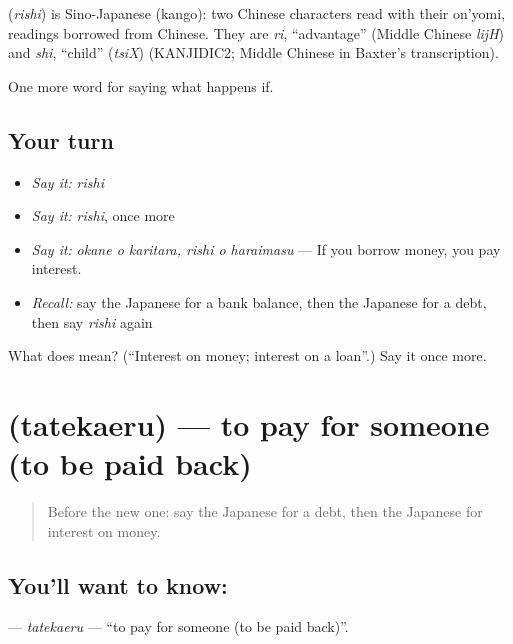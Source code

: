 \begin{cousinweb}
\textbf{} (\emph{rishi}) is Sino-Japanese (kango): two Chinese characters read with their on'yomi, readings borrowed from Chinese. They are \emph{ri}, \textquotedblleft{}advantage\textquotedblright{} (Middle Chinese \emph{lijH}) and \emph{shi}, \textquotedblleft{}child\textquotedblright{} (\emph{tsiX}) (KANJIDIC2; Middle Chinese in Baxter's transcription).
\end{cousinweb}

\begin{grammarlens}[title={What you've built}]
One more word for saying what happens if.
\end{grammarlens}

\subsection*{Your turn}
\begin{itemize}
\raggedright
  \item \emph{Say it:} \emph{rishi}
  \item \emph{Say it:} \emph{rishi}, once more
  \item \emph{Say it:} \emph{okane o karitara, rishi o haraimasu} — If you borrow money, you pay interest.
  \item \emph{Recall:} say the Japanese for a bank balance, then the Japanese for a debt, then say \emph{rishi} again
\end{itemize}

\begin{tcolorbox}[breakable,colback=teal!4,colframe=teal!35!black,title={Before you move on}]
What does  mean? (\textquotedblleft{}Interest on money; interest on a loan\textquotedblright{}.) Say it once more.
\end{tcolorbox}
\section[\texorpdfstring{\ja{たてかえる} (tatekaeru)}{たてかえる (tatekaeru)}]{ (tatekaeru) — to pay for someone (to be paid back)}

\label{lesson:JA-C359-tatekaeru}



\begin{quote}
Before the new one: say the Japanese for a debt, then the Japanese for interest on money.
\end{quote}

\subsection*{You'll want to know: }
\textbf{} — \emph{tatekaeru} — \textquotedblleft{}to pay for someone (to be paid back)\textquotedblright{}.

